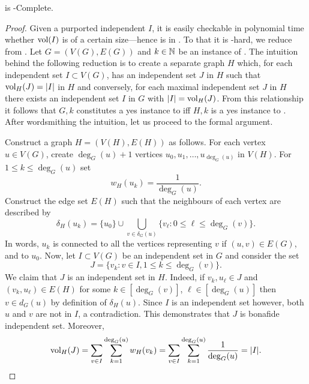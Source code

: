 \begin{lemma}
	\label{lem:vwis}
	\vwis is \NP-Complete. 
\end{lemma}
\begin{proof}
	Given a purported independent $I$, it is easily checkable in polynomial time whether $\textnormal{vol}(I)$ is of a certain size---hence \vwis is in \NP. 
	To that it is \NP-hard, we reduce from \iset. Let $G=(V(G),E(G))$ and  $k\in\mathbb{N}$ be an instance of \iset. The intuition behind the following reduction is to create a separate graph $H$ which, for each independent set $I\subset V(G)$, has an independent set $J$ in $H$ such that  $\textnormal{vol}_H(J)=|I|$ in $H$ and conversely, for each maximal independent set $J$ in $H$ there exists an independent set $I$ in $G$ with $|I| = \textnormal{vol}_H(J)$. From this relationship it follows that $G,k$ constitutes a yes instance to \iset iff $H,k$ is a yes instance to \mwis.  After wordsmithing the intuition, let us proceed to the formal argument. 

	Construct a graph $H=(V(H), E(H))$ as follows. For each vertex $u\in V(G)$, create $\deg_G(u)+1$ vertices $u_0,u_1,\dots,u_{\deg_G(u)}$ in $V(H)$. For $1\leq k\leq \deg_G(u)$ set \[w_H(u_k) =  \frac{1}{\deg_G(u)}.\] Construct the edge set $E(H)$ such that the neighbours of each vertex are described by 
	\begin{equation*}
	\delta_{H}(u_k) = \{u_0\}\cup \bigcup_{v\in \delta_G(u)}\{v_\ell: 0\leq \ell\leq \deg_G(v) \}.
 	\end{equation*}
	In words, $u_k$ is connected to all the vertices representing $v$ if $(u,v)\in E(G)$, and to $u_0$. Now, let $I\subset V(G)$ be an independent set in $G$ and consider the set
	\[J = \{v_k: v\in I, 1\leq k\leq \deg_G(v)\}.\]
	We claim that $J$ is an independent set in $H$. 
	Indeed, if $v_k,u_\ell\in J$ and  $(v_k,u_\ell) \in E(H)$ for some $k\in[\deg_G(v)]$, $\ell\in[\deg_G(u)]$ then $v\in d_G(u)$ by definition of $\delta_H(u)$. Since $I$ is an independent set however, both $u$ and $v$ are not in $I$, a contradiction. This demonstrates that $J$ is bonafide independent set. Moreover, 
	\[\textnormal{vol}_H(J) = \sum_{v\in I}\sum_{k=1}^{\deg_G(u)} w_H(v_k) = \sum_{v\in I}\sum_{k=1}^{\deg_G(u)} \frac{1}{\deg_G(u)} = |I|.\]


\end{proof}
